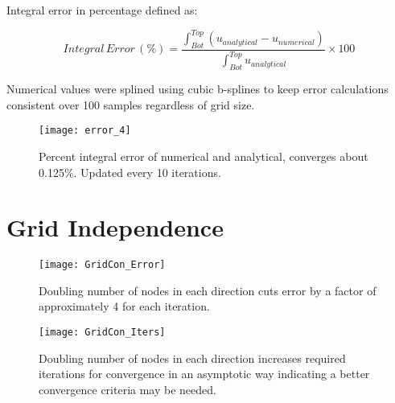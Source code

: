 \documentclass[10pt,english]{article}
\begin{document}
\noindent Integral error in percentage defined as:

    \begin{equation}
       Integral\,Error\,(\%) = \frac{\int_{Bot}^{Top}{(u_{analytical}-u_{numerical})}}{\int_{Bot}^{Top}{u_{analytical}}} \times 100
    \end{equation}
    
\noindent Numerical values were splined using cubic b-splines to keep error calculations consistent over 100 samples regardless of grid size.


\begin{figure}[H]
\centering
\texttt{[image: error\_4]}
\vspace{-5pt}
\caption{Percent integral error of numerical and analytical, converges about 0.125\%. Updated every 10 iterations.}
\label{f:3b}
\end{figure}

\FloatBarrier
\vspace{5pt}
\section{Grid Independence}


\begin{figure}[htbp]
\centering
\texttt{[image: GridCon\_Error]}
\vspace{-5pt}
\caption{Doubling number of nodes in each direction cuts error by a factor of approximately 4 for each iteration.}
\label{f:3b}
\end{figure}


\begin{figure}[H]
\centering
\texttt{[image: GridCon\_Iters]}
\vspace{-5pt}
\caption{Doubling number of nodes in each direction increases required iterations for convergence in an asymptotic way indicating a better convergence criteria may be needed.}
\label{f:3b}
\end{figure}
\end{document}
